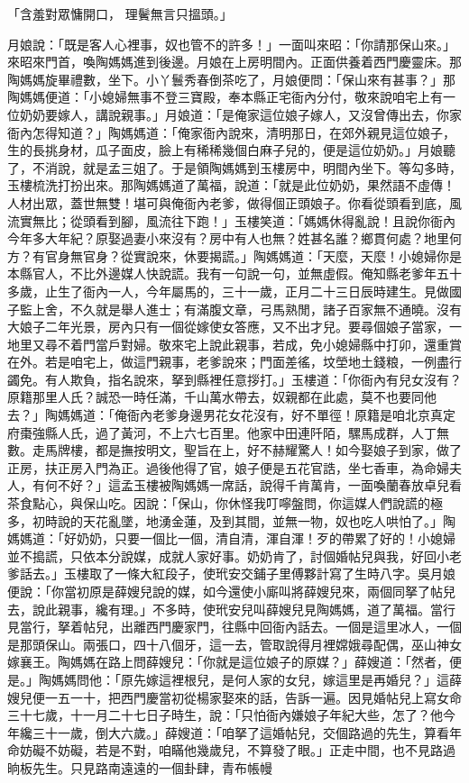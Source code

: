 「含羞對眾慵開口，  理鬢無言只搵頭。」

月娘說：「既是客人心裡事，奴也管不的許多！」一面叫來昭：「你請那保山來。」來昭來門首，喚陶媽媽進到後邊。月娘在上房明間內。正面供養着西門慶靈床。那陶媽媽旋畢禮數，坐下。小丫鬟秀春倒茶吃了，月娘便問：「保山來有甚事？」那陶媽媽便道：「小媳婦無事不登三寶殿，奉本縣正宅衙內分付，敬來說咱宅上有一位奶奶要嫁人，講說親事。」月娘道：「是俺家這位娘子嫁人，又沒曾傳出去，你家衙內怎得知道？」陶媽媽道：「俺家衙內說來，清明那日，在郊外親見這位娘子，生的長挑身材，瓜子面皮，臉上有稀稀幾個白麻子兒的，便是這位奶奶。」月娘聽了，不消說，就是孟三姐了。于是領陶媽媽到玉樓房中，明間內坐下。等勾多時，玉樓梳洗打扮出來。那陶媽媽道了萬福，說道：「就是此位奶奶，果然語不虛傳！人材出眾，蓋世無雙！堪可與俺衙內老爹，做得個正頭娘子。你看從頭看到底，風流實無比；從頭看到腳，風流往下跑！」玉樓笑道：「媽媽休得亂說！且說你衙內今年多大年紀？原娶過妻小來沒有？房中有人也無？姓甚名誰？鄉貫何處？地里何方？有官身無官身？從實說來，休要揭謊。」陶媽媽道：「天麼，天麼！小媳婦你是本縣官人，不比外邊媒人快說謊。我有一句說一句，並無虛假。俺知縣老爹年五十多歲，止生了衙內一人，今年屬馬的，三十一歲，正月二十三日辰時建生。見做國子監上舍，不久就是舉人進士；有滿腹文章，弓馬熟閒，諸子百家無不通曉。沒有大娘子二年光景，房內只有一個從嫁使女答應，又不出才兒。要尋個娘子當家，一地里又尋不着門當戶對婦。敬來宅上說此親事，若成，免小媳婦縣中打卯，還重賞在外。若是咱宅上，做這門親事，老爹說來；門面差徭，坟塋地土錢粮，一例盡行蠲免。有人欺負，指名說來，拏到縣裡任意拶打。」玉樓道：「你衙內有兒女沒有？原籍那里人氏？誠恐一時任滿，千山萬水帶去，奴親都在此處，莫不也要同他去？」陶媽媽道：「俺衙內老爹身邊男花女花沒有，好不單徑！原籍是咱北京真定府棗強縣人氏，過了黃河，不上六七百里。他家中田連阡陌，騾馬成群，人丁無數。走馬牌樓，都是撫按明文，聖旨在上，好不赫耀驚人！如今娶娘子到家，做了正房，扶正房入門為正。過後他得了官，娘子便是五花官誥，坐七香車，為命婦夫人，有何不好？」這孟玉樓被陶媽媽一席話，說得千肯萬肯，一面喚蘭春放卓兒看茶食點心，與保山吃。因說：「保山，你休怪我叮嚀盤問，你這媒人們說謊的極多，初時說的天花亂墜，地湧金蓮，及到其間，並無一物，奴也吃人哄怕了。」陶媽媽道：「好奶奶，只要一個比一個，清自清，渾自渾！歹的帶累了好的！小媳婦並不搗謊，只依本分說媒，成就人家好事。奶奶肯了，討個婚帖兒與我，好回小老爹話去。」玉樓取了一條大紅段子，使玳安交鋪子里傅夥計寫了生時八字。吳月娘便說：「你當初原是薛嫂兒說的媒，如今還使小廝叫將薛嫂兒來，兩個同拏了帖兒去，說此親事，纔有理。」不多時，使玳安兒叫薛嫂兒見陶媽媽，道了萬福。當行見當行，拏着帖兒，出離西門慶家門，往縣中回衙內話去。一個是這里冰人，一個是那頭保山。兩張口，四十八個牙，這一去，管取說得月裡嫦娥尋配偶，巫山神女嫁襄王。陶媽媽在路上問薛嫂兒：「你就是這位娘子的原媒？」薛嫂道：「然者，便是。」陶媽媽問他：「原先嫁這裡根兒，是何人家的女兒，嫁這里是再婚兒？」這薛嫂兒便一五一十，把西門慶當初從楊家娶來的話，告訴一遍。因見婚帖兒上寫女命三十七歲，十一月二十七日子時生，說：「只怕衙內嫌娘子年紀大些，怎了？他今年纔三十一歲，倒大六歲。」薛嫂道：「咱拏了這婚帖兒，交個路過的先生，算看年命妨礙不妨礙，若是不對，咱瞞他幾歲兒，不算發了眼。」正走中間，也不見路過晌板先生。只見路南遠遠的一個卦肆，青布帳幔